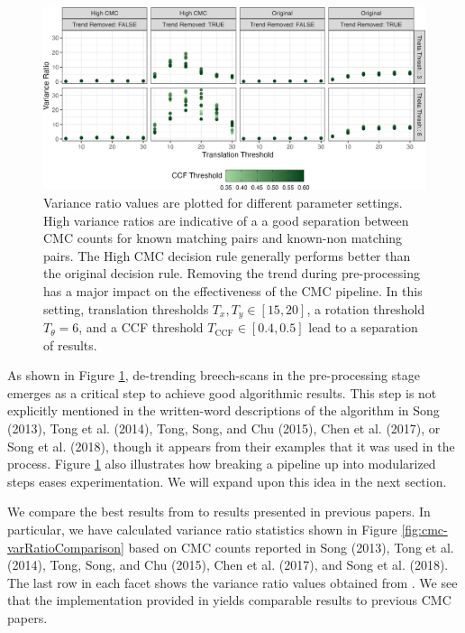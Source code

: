 \begin{figure}[htbp]

{\centering \includegraphics[width=\textwidth]{figures/varianceRatioPlt} 

}

\caption{Variance ratio values are plotted for different parameter settings. High variance ratios are indicative of a a good separation between CMC counts for known matching pairs and known-non matching pairs. The High CMC decision rule generally performs better than the original decision rule. Removing the trend during pre-processing has a major impact on the effectiveness of the CMC pipeline. In this setting, translation thresholds $T_x, T_y \in [15,20]$, a rotation threshold $T_\theta = 6$, and a CCF threshold $T_{\text{CCF}} \in [0.4,0.5]$ lead to a separation of results. }\label{fig:cmc-sensitivityScatter}
\end{figure}

As shown in Figure \ref{fig:cmc-sensitivityScatter}, de-trending breech-scans in the pre-processing stage emerges as a critical step to achieve good algorithmic results.
This step is not explicitly mentioned in the written-word descriptions of the algorithm in Song (2013), Tong et al. (2014), Tong, Song, and Chu (2015), Chen et al. (2017), or Song et al. (2018), though it appears from their examples that it was used in the process.
Figure \ref{fig:cmc-sensitivityScatter} also illustrates how breaking a pipeline up into modularized steps eases experimentation.
We will expand upon this idea in the next section.

We compare the best results from  to results presented in previous papers.
In particular, we have calculated variance ratio statistics shown in Figure \ref{fig:cmc-varRatioComparison} based on CMC counts reported in Song (2013), Tong et al. (2014), Tong, Song, and Chu (2015), Chen et al. (2017), and Song et al. (2018).
The last row in each facet shows the variance ratio values obtained from .
We see that the implementation provided in  yields comparable results to previous CMC papers.

